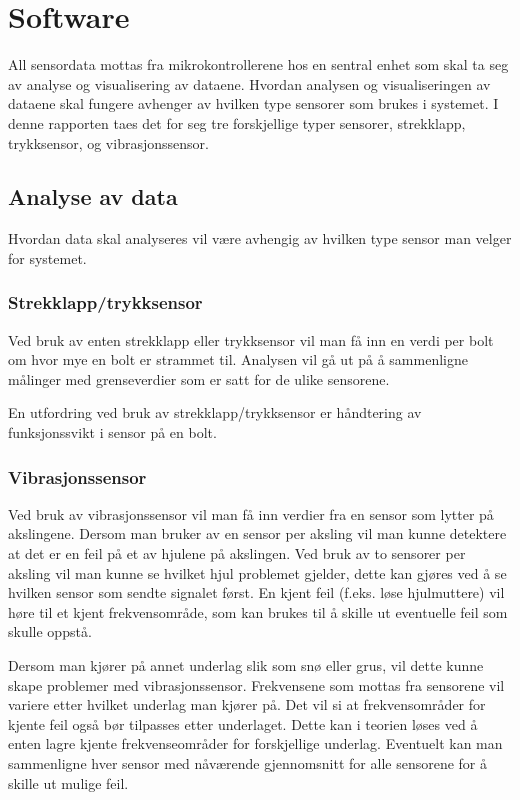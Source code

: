 \section{Software}
All sensordata mottas fra mikrokontrollerene hos en sentral enhet som skal ta seg 
av analyse og visualisering av dataene. Hvordan analysen og visualiseringen av 
dataene skal fungere avhenger av hvilken type sensorer som brukes i systemet. I 
denne rapporten taes det for seg tre forskjellige typer sensorer, strekklapp, 
trykksensor, og vibrasjonssensor.

\subsection{Analyse av data}
Hvordan data skal analyseres vil være avhengig av hvilken type sensor man velger 
for systemet. 

\subsubsection{Strekklapp/trykksensor}
Ved bruk av enten strekklapp eller trykksensor vil man få inn en verdi per bolt 
om hvor mye en bolt er strammet til. Analysen vil gå ut på å sammenligne målinger 
med grenseverdier som er satt for de ulike sensorene.

En utfordring ved bruk av strekklapp/trykksensor er håndtering av 
funksjonssvikt i sensor på en bolt.

\subsubsection{Vibrasjonssensor}
Ved bruk av vibrasjonssensor vil man få inn verdier fra en sensor som lytter på 
akslingene. Dersom man bruker av en sensor per aksling vil man kunne detektere at 
det er en feil på et av hjulene på akslingen. Ved bruk av to sensorer per aksling 
vil man kunne se hvilket hjul problemet gjelder, dette kan gjøres ved å se 
hvilken sensor som sendte signalet først. En kjent feil (f.eks. løse hjulmuttere) vil 
høre til et kjent frekvensområde, som kan brukes til å skille ut eventuelle 
feil som skulle oppstå.

Dersom man kjører på annet underlag slik som snø eller grus, vil dette kunne 
skape problemer med vibrasjonssensor. Frekvensene som mottas fra sensorene vil 
variere etter hvilket underlag man kjører på. Det vil si at frekvensområder for 
kjente feil også bør tilpasses etter underlaget. Dette kan i teorien løses ved å 
enten lagre kjente frekvenseområder for forskjellige underlag. Eventuelt kan man 
sammenligne hver sensor med nåværende gjennomsnitt for alle sensorene for å 
skille ut mulige feil. 

